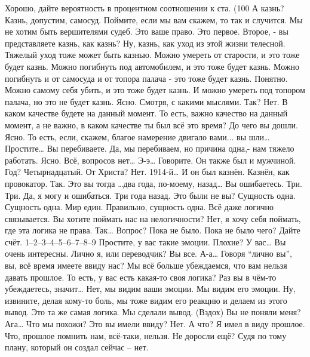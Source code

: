 \documentclass{extbook}
\newcommand{\soul}[1]{{#1}}
\newcommand{\people}[1]{{#1}}
\begin{document}
\people{Хорошо,  дайте вероятность в процентном соотношении к ста. (100%
\soul{А казнь?}
\people{Казнь, допустим, самосуд.}
\soul{Поймите, если мы вам скажем, то так и случится. Мы не хотим быть вершителями судеб. Это ваше право. Это первое. Второе, - вы представляете казнь, как казнь?}
\people{Ну, казнь, как уход  из этой жизни телесной.}
\soul{Тяжелый уход тоже может быть казнью. Можно умереть от старости, и это тоже будет казнь. Можно погибнуть под автомобилем, и это тоже будет казнь. Можно погибнуть и от самосуда и от топора  палача -  это тоже будет казнь. }
\people{Понятно. Можно самому себя убить, и это тоже будет казнь.}
\soul{И можно  умереть под  топором палача, но  это не будет казнь.}
\people{Ясно. Смотря, с какими  мыслями.  Так?}
\soul{Нет. В каком качестве будете на данный момент.}
\people{То есть,  важно качество на данный момент, а не важно,  в каком  качестве ты был всё это время?}
\soul{До чего вы дошли. }
\people{Ясно. То есть, если, скажем, благое намерение двигало вами... вы шли…}
\soul{Простите…}
\people{Вы перебиваете.}
\soul{Да, мы перебиваем, но причина одна,-  нам тяжело работать.}
\people{Ясно. Всё, вопросов нет… Э-э… Говорите.}
\soul{Он также был и мужчиной. }
\people{Год?}
\soul{Четырнадцатый.}
\people{От Христа?}
\soul{Нет. 1914-й… И он был казнён. Казнён, как провокатор. }
\people{Так. Это вы тогда …два года, по-моему, назад…}
\soul{Вы ошибаетесь. Три.}
\people{Три. Да, я могу и ошибаться. Три года назад. Это были не вы? }
\soul{Сущность одна.}
\people{Сущность одна.  Мир един. Правильно, сущность одна. Всё даже логично связывается. }
\soul{Вы хотите  поймать  нас на нелогичности?}
\people{Нет, я хочу себя поймать, где эта логика не права. Так… Вопрос?}
\soul{Пока не было.}
\people{Пока не было чего? }
\soul{Дайте счёт.}
\people{1–2–3–4–5–6–7–8–9}
\soul{Простите,  у вас такие эмоции.}
\people{Плохие?}
\soul{У вас… Вы очень интересны.}
\people{Лично я, или переводчик?}
\soul{Вы все.}
\people{А-а… Говоря ``лично вы'',  вы, всё время  имеете ввиду нас?}
\soul{Мы всё больше убеждаемся, что вам нельзя давать прошлое.}
\people{То есть, у вас есть какая-то своя логика? Раз вы в чём-то убеждаетесь, значит…}
\soul{Нет, мы видим ваши эмоции. Мы видим  его эмоции.}
\people{Ну, извините, делая кому-то боль, мы тоже видим его реакцию и делаем из этого вывод. Это та же самая логика.}
\soul{ Мы сделали вывод.}
\people{(Вздох)}
\soul{ Вы не поняли меня? }
\people{Ага… Что мы похожи?  Это вы имели ввиду?}
\soul{Нет.}
\people{А что?}
\soul{Я имел в виду прошлое.}
\people{Что, прошлое помнить нам, всё-таки, нельзя. Не доросли ещё?}
\soul{Судя по тому  плану, который он создал  сейчас – нет.}
}
\end{document}
